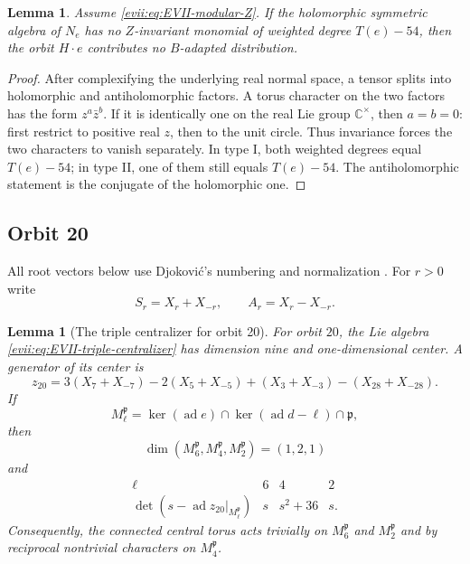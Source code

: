 \documentclass[10pt,a4paper]{amsart}
\numberwithin{equation}{section}
\newtheorem{lemma}[theorem]{Lemma}
\newcommand{\C}{\mathbb C}
\newcommand{\ad}{\operatorname{ad}}
\newcommand{\fp}{\mathfrak p}
\begin{document}
\begin{lemma}\label{evii:lem:EVII-holomorphic-test}
Assume \eqref{evii:eq:EVII-modular-Z}.  If the holomorphic symmetric algebra of
$N_e$ has no $Z$-invariant monomial of weighted degree $T(e)-54$, then the
orbit $H\cdot e$ contributes no $B$-adapted distribution.
\end{lemma}

\begin{proof}
After complexifying the underlying real normal space, a tensor splits into
holomorphic and antiholomorphic factors.  A torus character on the two factors
has the form $z^a\bar z^b$.  If it is identically one on the real Lie group
$\C^\times$, then $a=b=0$: first restrict to positive real $z$, then to the
unit circle.  Thus invariance forces the two characters to vanish separately.
In type I, both weighted degrees equal $T(e)-54$; in type II, one of them still
equals $T(e)-54$.  The antiholomorphic statement is the conjugate of the
holomorphic one.
\end{proof}

\subsection{Orbit 20}

All root vectors below use Djokovi\'c's numbering and normalization
\cite[Tables~1 and~3 and Appendix]{Djokovic}.  For $r>0$ write
\begin{equation}\label{evii:eq:SA-notation}
 S_r=X_r+X_{-r},\qquad A_r=X_r-X_{-r}.
\end{equation}

\begin{lemma}[The triple centralizer for orbit 20]\label{evii:lem:EVII-orbit20-centralizer}
For orbit $20$, the Lie algebra \eqref{evii:eq:EVII-triple-centralizer} has dimension
nine and one-dimensional center.  A generator of its center is
\begin{equation}\label{evii:eq:EVII-z20}
 z_{20}=3(X_7+X_{-7})-2(X_5+X_{-5})
 +(X_3+X_{-3})-(X_{28}+X_{-28}).
\end{equation}
If
\[
 M_\ell^{\fp}=\ker(\ad e)\cap\ker(\ad d-\ell)\cap\fp,
\]
then
\[
 \dim(M_6^{\fp},M_4^{\fp},M_2^{\fp})=(1,2,1)
\]
and
\begin{equation}\label{evii:eq:EVII-z20-char}
\begin{array}{c|ccc}
\ell&6&4&2\\ \hline
\det(s-\ad z_{20}|_{M_\ell^{\fp}})&s&s^2+36&s.
\end{array}
\end{equation}
Consequently, the connected central torus acts trivially on
$M_6^{\fp}$ and $M_2^{\fp}$ and by reciprocal nontrivial characters on
$M_4^{\fp}$.
\end{lemma}
\end{document}
